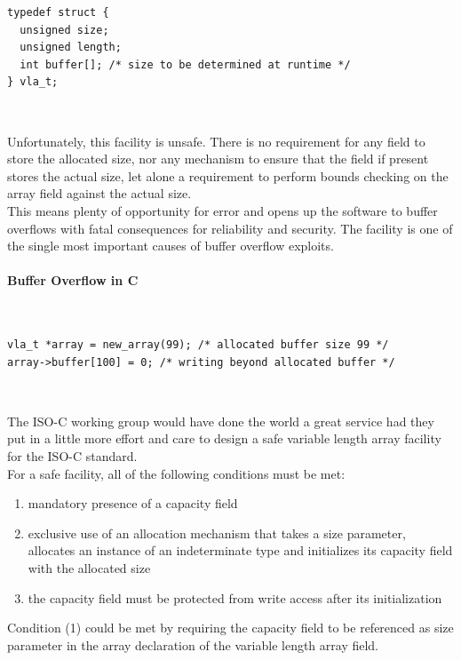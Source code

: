 \documentclass[10pt,a4paper]{article}
\newcommand\sourcecaption[1]{\noindent\normalfont\small\textsf{#1}}
\begin{document}
\lstset{style=C}
\begin{lstlisting}
typedef struct {
  unsigned size;
  unsigned length;
  int buffer[]; /* size to be determined at runtime */
} vla_t;
\end{lstlisting}~

\noindent Unfortunately, this facility is unsafe. There is no requirement 
for any field to store the allocated size, nor any mechanism to ensure that
the field if present stores the actual size, let alone a requirement to
perform bounds checking on the array field against the actual size.\\

\noindent This means plenty of opportunity for error and opens up the software
to buffer overflows with fatal consequences for reliability and security. The 
facility is one of the single most important causes of buffer overflow
exploits.


\paragraph{\sourcecaption{Buffer Overflow in C}}~

\lstset{style=C}
\begin{lstlisting}
vla_t *array = new_array(99); /* allocated buffer size 99 */
array->buffer[100] = 0; /* writing beyond allocated buffer */
\end{lstlisting}~
 
\noindent The ISO-C working group would have done the world a great service
had they put in a little more effort and care to design a safe variable length
array facility for the ISO-C standard.\\

\noindent For a safe facility, all of the following conditions must be met:

\renewcommand{\labelenumi}{(\arabic{enumi})}
\begin{enumerate}[leftmargin=!, labelindent=-0.75em, itemindent=0em]
\item mandatory presence of a \gls{capacity field}
\item exclusive use of an allocation mechanism that takes a size parameter,
allocates an instance of an \gls{indeterminate type} and initializes its
\gls{capacity field} with the allocated size
\item the \gls{capacity field} must be protected from write
access after its initialization
\end{enumerate}

\noindent Condition (1) could be met by requiring the \gls{capacity field}
to be referenced as size parameter in the array declaration of the variable
length array field.
\end{document}
